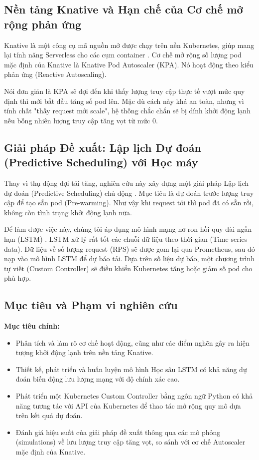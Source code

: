 \subsection{Nền tảng Knative và Hạn chế của Cơ chế mở rộng phản ứng}
Knative là một công cụ mã nguồn mở được chạy trên nền Kubernetes, giúp mang lại tính năng Serverless cho các cụm container \cite{knative2023}. Cơ chế mở rộng số lượng pod mặc định của Knative là Knative Pod Autoscaler (KPA). Nó hoạt động theo kiểu phản ứng (Reactive Autoscaling).

Nói đơn giản là KPA sẽ đợi đến khi thấy lượng truy cập thực tế vượt mức quy định thì mới bắt đầu tăng số pod lên. Mặc dù cách này khá an toàn, nhưng vì tính chất "thấy request mới scale", hệ thống chắc chắn sẽ bị dính khởi động lạnh nếu bỗng nhiên lượng truy cập tăng vọt từ mức 0.

\subsection{Giải pháp Đề xuất: Lập lịch Dự đoán (Predictive Scheduling) với Học máy}
Thay vì thụ động đợi tải tăng, nghiên cứu này xây dựng một giải pháp Lập lịch dự đoán (Predictive Scheduling) chủ động \cite{daw2020predictive}. Mục tiêu là dự đoán trước lượng truy cập để tạo sẵn pod (Pre-warming). Như vậy khi request tới thì pod đã có sẵn rồi, không còn tình trạng khởi động lạnh nữa.

Để làm được việc này, chúng tôi áp dụng mô hình mạng nơ-ron hồi quy dài-ngắn hạn (LSTM) \cite{hochreiter1997long}. LSTM xử lý rất tốt các chuỗi dữ liệu theo thời gian (Time-series data). Dữ liệu về số lượng request (RPS) sẽ được gom lại qua Prometheus, sau đó nạp vào mô hình LSTM để dự báo tải. Dựa trên số liệu dự báo, một chương trình tự viết (Custom Controller) sẽ điều khiển Kubernetes tăng hoặc giảm số pod cho phù hợp.

\subsection{Mục tiêu và Phạm vi nghiên cứu}
\textbf{Mục tiêu chính:}
\begin{itemize}
    \item Phân tích và làm rõ cơ chế hoạt động, cũng như các điểm nghẽn gây ra hiện tượng khởi động lạnh trên nền tảng Knative.
    \item Thiết kế, phát triển và huấn luyện mô hình Học sâu LSTM có khả năng dự đoán biến động lưu lượng mạng với độ chính xác cao.
    \item Phát triển một Kubernetes Custom Controller bằng ngôn ngữ Python có khả năng tương tác với API của Kubernetes để thao tác mở rộng quy mô dựa trên kết quả dự đoán.
    \item Đánh giá hiệu suất của giải pháp đề xuất thông qua các mô phỏng (simulations) về lưu lượng truy cập tăng vọt, so sánh với cơ chế Autoscaler mặc định của Knative.
\end{itemize}

